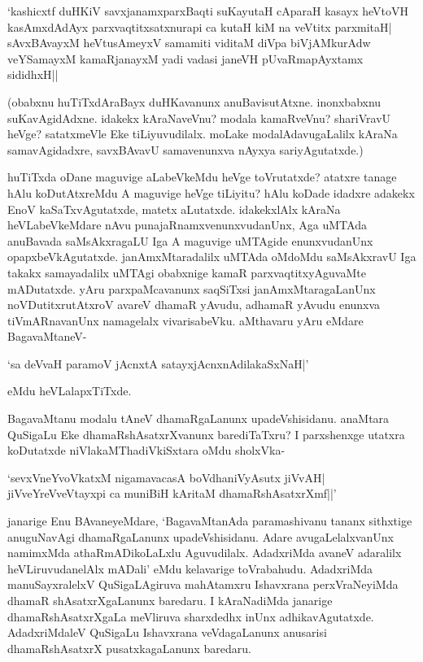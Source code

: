 \begin{shloka}
`kashicxtf duHKiV savxjanamxparxBaqti suKayutaH cAparaH kasayx heVtoVH\\
kasAmxdAdAyx parxvaqtitxsatxnurapi ca kutaH kiM na veVtitx parxmitaH|\\
sAvxBAvayxM heVtusAmeyxV samamiti viditaM diVpa biVjAMkurAdw\\
veYSamayxM kamaRjanayxM yadi vadasi janeVH pUvaRmapAyxtamx sididhxH||
\end{shloka}

(obabxnu huTiTxdAraBayx duHKavanunx anuBavisutAtxne. inonxbabxnu suKavAgidAdxne. idakekx kAraNaveVnu? modala kamaRveVnu? shariVravU heVge? satatxmeVle Eke tiLiyuvudilalx. moLake modalAdavugaLalilx kAraNa samavAgidadxre, savxBAvavU samavenunxva nAyxya sariyAgutatxde.)

huTiTxda oDane maguvige aLabeVkeMdu heVge toVrutatxde? atatxre tanage hAlu koDutAtxreMdu A maguvige heVge tiLiyitu? hAlu koDade idadxre adakekx EnoV kaSaTxvAgutatxde, matetx aLutatxde. idakekxlAlx kAraNa heVLabeVkeMdare nAvu punajaRnamxvenunxvudanUnx, Aga uMTAda anuBavada saMsAkxragaLU Iga A maguvige uMTAgide enunxvudanUnx opapxbeVkAgutatxde. janAmxMtaradalilx uMTAda oMdoMdu saMsAkxravU Iga takakx samayadalilx uMTAgi obabxnige kamaR parxvaqtitxyAguvaMte mADutatxde. yAru parxpaMcavanunx saqSiTxsi janAmxMtaragaLanUnx noVDutitxrutAtxroV avareV dhamaR yAvudu, adhamaR yAvudu enunxva tiVmARnavanUnx namagelalx vivarisabeVku. aMthavaru yAru eMdare BagavaMtaneV-

\begin{shloka}
`sa deVvaH paramoV jAcnxtA satayxjAcnxnAdilakaSxNaH|'
\end{shloka}

\noindent eMdu heVLalapxTiTxde.

BagavaMtanu modalu tAneV dhamaRgaLanunx upadeVshisidanu. anaMtara QuSigaLu Eke dhamaRshAsatxrXvanunx barediTaTxru? I parxshenxge utatxra koDutatxde niVlakaMThadiVkiSxtara oMdu sholxVka-

\begin{shloka}
`sevxVneYvoVkatxM nigamavacasA boVdhaniVyAsutx jiVvAH|\\
jiVveYreVveVtayxpi ca muniBiH kAritaM dhamaRshAsatxrXmf||'
\end{shloka}

janarige Enu BAvaneyeMdare, `BagavaMtanAda paramashivanu tananx sithxtige anuguNavAgi dhamaRgaLanunx upadeVshisidanu. Adare avugaLelalxvanUnx namimxMda athaRmADikoLaLxlu Aguvudilalx. AdadxriMda avaneV adaralilx heVLiruvudanelAlx mADali' eMdu kelavarige toVrabahudu. AdadxriMda manuSayxralelxV QuSigaLAgiruva mahAtamxru Ishavxrana perxVraNeyiMda dhamaR shAsatxrXgaLanunx baredaru. I kAraNadiMda janarige dhamaRshAsatxrXgaLa meVliruva sharxdedhx inUnx adhikavAgutatxde. AdadxriMdaleV QuSigaLu Ishavxrana veVdagaLanunx anusarisi dhamaRshAsatxrX pusatxkagaLanunx baredaru.

